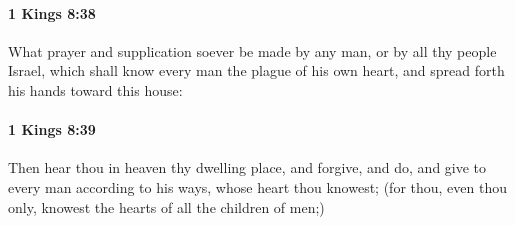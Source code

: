 		\paragraph{1 Kings 8:38} %
			\label{1KINGS-8-38}

			What prayer and supplication soever be made by any man, or by all thy people Israel, which shall know every man the plague of his own heart, and spread forth his hands toward this house:


		\paragraph{1 Kings 8:39} %
			\label{1KINGS-8-39}

			Then hear thou in heaven thy dwelling place, and forgive, and do, and give to every man according to his ways, whose heart thou knowest; (for thou, even thou only, knowest the hearts of all the children of men;)

